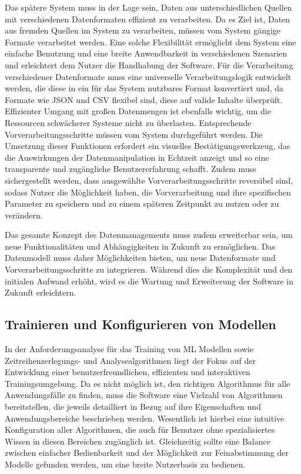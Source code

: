 Das spätere System muss in der Lage sein, Daten aus unterschiedlichen Quellen mit verschiedenen Datenformaten effizient zu verarbeiten. Da es Ziel ist, Daten aus fremden Quellen im System zu verarbeiten, 
müssen vom System gängige Formate verarbeitet werden. Eine solche Flexibilität ermöglicht dem System eine einfache Benutzung und eine breite Anwendbarkeit in verschiedenen Szenarien und erleichtert dem Nutzer die Handhabung der Software. Für die Verarbeitung verschiedener Datenformate muss eine universelle Verarbeitungslogik 
entwickelt werden, die diese in ein für das System nutzbares Format konvertiert und, da Formate wie JSON und CSV flexibel sind, diese auf valide Inhalte überprüft. Effizienter Umgang mit großen Datenmengen ist ebenfalls wichtig, 
um die Ressourcen schwächerer Systeme nicht zu überlasten. Entsprechende Vorverarbeitungsschritte müssen vom System durchgeführt werden. Die Umsetzung dieser Funktionen erfordert ein visuelles Bestätigungswerkzeug, das die Auswirkungen der 
Datenmanipulation in Echtzeit anzeigt und so eine transparente und zugängliche Benutzererfahrung schafft. Zudem muss sichergestellt werden, dass ausgewählte Vorverarbeitungsschritte reversibel sind, sodass Nutzer die Möglichkeit haben, die 
Vorverarbeitung und ihre spezifischen Parameter zu speichern und zu einem späteren Zeitpunkt zu nutzen oder zu verändern.

Das gesamte Konzept des Datenmanagements muss zudem erweiterbar sein, um neue Funktionalitäten und Abhängigkeiten in Zukunft zu ermöglichen. Das Datenmodell muss daher Möglichkeiten bieten, um neue Datenformate und Vorverarbeitungsschritte zu 
integrieren. Während dies die Komplexität und den initialen Aufwand erhöht, wird es die Wartung und Erweiterung der Software in Zukunft erleichtern.


\subsection{Trainieren und Konfigurieren von Modellen}
\label{concept:training}
In der Anforderungsanalyse für das Training von \ac{ML} Modellen sowie Zeitreihenzerlegungs- und Analysealgorithmen liegt der Fokus auf der Entwicklung einer benutzerfreundlichen, effizienten und interaktiven Trainingsumgebung.
Da es nicht möglich ist, den richtigen Algorithmus für alle Anwendungsfälle zu finden, muss die Software eine Vielzahl von Algorithmen bereitstellen, die jeweils detailliert in Bezug auf ihre Eigenschaften und Anwendungsbereiche beschrieben werden.
Wesentlich ist hierbei eine intuitive Konfiguration aller Algorithmen, die auch für Benutzer ohne spezialisiertes Wissen in diesen Bereichen zugänglich ist. 
Gleichzeitig sollte eine Balance zwischen einfacher Bedienbarkeit und der Möglichkeit zur Feinabstimmung der Modelle gefunden werden, um eine breite Nutzerbasis zu bedienen.

